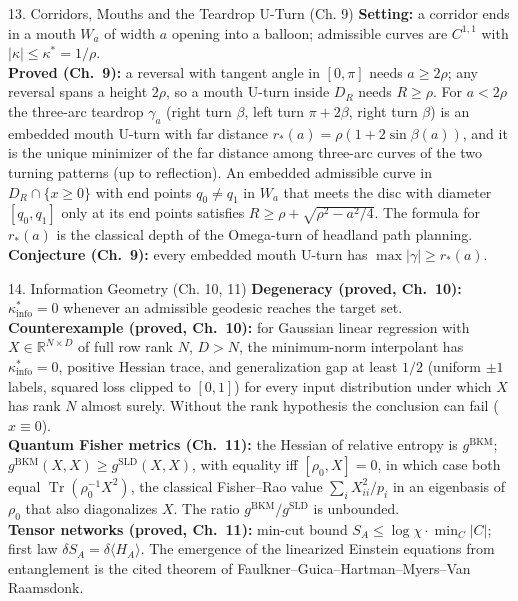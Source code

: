 \documentclass[11pt,a4paper,oneside]{article}
\begin{document}
\begin{conceptbox}{{13. Corridors, Mouths and the Teardrop U-Turn (Ch. 9)}}
\textbf{Setting:} a corridor ends in a mouth $W_a$ of width $a$ opening into a balloon; admissible curves are $C^{1,1}$ with $|\kappa| \le \kappa^* = 1/\rho$.\\
\textbf{Proved (Ch.~9):} a reversal with tangent angle in $[0,\pi]$ needs $a \ge 2\rho$; any reversal spans a height $2\rho$, so a mouth U-turn inside $D_R$ needs $R \ge \rho$. For $a < 2\rho$ the three-arc teardrop $\gamma_a$ (right turn $\beta$, left turn $\pi + 2\beta$, right turn $\beta$) is an embedded mouth U-turn with far distance $r_*(a) = \rho(1 + 2\sin\beta(a))$, and it is the unique minimizer of the far distance among three-arc curves of the two turning patterns (up to reflection). An embedded admissible curve in $D_R \cap \{x \ge 0\}$ with end points $q_0 \ne q_1$ in $W_a$ that meets the disc with diameter $[q_0, q_1]$ only at its end points satisfies $R \ge \rho + \sqrt{\rho^2 - a^2/4}$. The formula for $r_*(a)$ is the classical depth of the Omega-turn of headland path planning.\\
\textbf{Conjecture (Ch.~9):} every embedded mouth U-turn has $\max|\gamma| \ge r_*(a)$.
\end{conceptbox}

\begin{conceptbox}{{14. Information Geometry (Ch. 10, 11)}}
\textbf{Degeneracy (proved, Ch.~10):} $\kappa^*_{\mathrm{info}} = 0$ whenever an admissible geodesic reaches the target set.\\
\textbf{Counterexample (proved, Ch.~10):} for Gaussian linear regression with $X \in \mathbb{R}^{N\times D}$ of full row rank $N$, $D > N$, the minimum-norm interpolant has $\kappa^*_{\mathrm{info}} = 0$, positive Hessian trace, and generalization gap at least $1/2$ (uniform $\pm1$ labels, squared loss clipped to $[0,1]$) for every input distribution under which $X$ has rank $N$ almost surely. Without the rank hypothesis the conclusion can fail ($x \equiv 0$).\\
\textbf{Quantum Fisher metrics (Ch.~11):} the Hessian of relative entropy is $g^{\mathrm{BKM}}$; $g^{\mathrm{BKM}}(X,X) \ge g^{\mathrm{SLD}}(X,X)$, with equality iff $[\rho_0, X] = 0$, in which case both equal $\operatorname{Tr}(\rho_0^{-1}X^2)$, the classical Fisher--Rao value $\sum_i X_{ii}^2/p_i$ in an eigenbasis of $\rho_0$ that also diagonalizes $X$. The ratio $g^{\mathrm{BKM}}/g^{\mathrm{SLD}}$ is unbounded.\\
\textbf{Tensor networks (proved, Ch.~11):} min-cut bound $S_A \le \log\chi\cdot\min_C|C|$; first law $\delta S_A = \delta\langle H_A\rangle$. The emergence of the linearized Einstein equations from entanglement is the cited theorem of Faulkner--Guica--Hartman--Myers--Van Raamsdonk.
\end{conceptbox}
\end{document}
